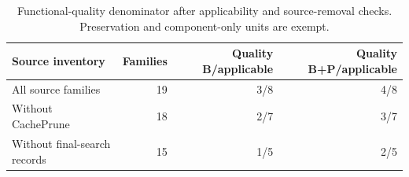 \begin{table}[ht]\centering\small
\caption{Functional-quality denominator after applicability and source-removal checks. Preservation and component-only units are exempt.}\label{tab:r41-removal}
\begin{tabularx}{\linewidth}{@{}Yrrr@{}}\toprule
Source inventory & Families & Quality B/applicable & Quality B+P/applicable\\\midrule
All source families & 19 & 3/8 & 4/8\\
Without CachePrune & 18 & 2/7 & 3/7\\
Without final-search records & 15 & 1/5 & 2/5\\
\bottomrule\end{tabularx}\end{table}
